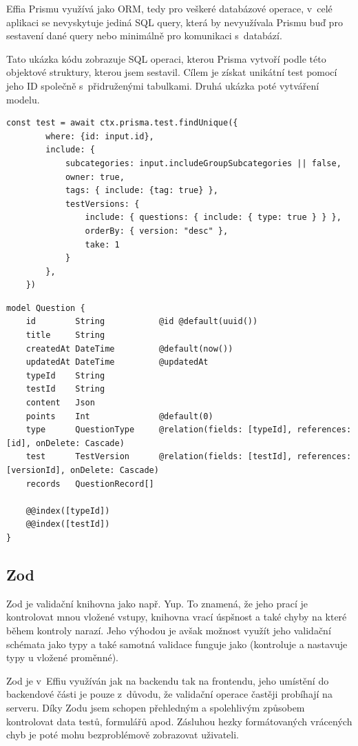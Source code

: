 \documentclass[12pt, a4paper,
openright
]{report}
\begin{document}
Effia Prismu využívá jako ORM, tedy pro veškeré databázové operace, v~celé aplikaci se nevyskytuje jediná SQL query, která by nevyužívala Prismu buď pro sestavení dané query nebo minimálně pro komunikaci s~databází.

Tato ukázka kódu zobrazuje SQL operaci, kterou Prisma vytvoří podle této objektové struktury, kterou jsem sestavil. Cílem je získat unikátní test pomocí jeho ID společně s~přidruženými tabulkami. Druhá ukázka poté vytváření modelu.

\begin{lstlisting}[style=ES6, caption=Získání testu podle id a přidání dat ze spojených tabulek, label=prisma_code_use]
	const test = await ctx.prisma.test.findUnique({
		where: {id: input.id},
		include: {
			subcategories: input.includeGroupSubcategories || false,
			owner: true,
			tags: {	include: {tag: true} },
			testVersions: {
				include: { questions: { include: { type: true } } },
				orderBy: { version: "desc" },
				take: 1
			}
		},
	})
\end{lstlisting}

\begin{lstlisting}[style=ES6, caption=Schéma modelu verze testu, label=prisma_code_schema]
model Question {
	id        String           @id @default(uuid())
	title     String
	createdAt DateTime         @default(now())
	updatedAt DateTime         @updatedAt
	typeId    String
	testId    String
	content   Json
	points    Int              @default(0)
	type      QuestionType     @relation(fields: [typeId], references: [id], onDelete: Cascade)
	test      TestVersion      @relation(fields: [testId], references: [versionId], onDelete: Cascade)
	records   QuestionRecord[]
	
	@@index([typeId])
	@@index([testId])
}
\end{lstlisting}

\subsection{Zod}
Zod je validační knihovna jako např. Yup. To znamená, že jeho prací je kontrolovat mnou vložené vstupy, knihovna vrací úspšnost a také chyby na které během kontroly narazí. Jeho výhodou je avšak možnost využít jeho validační schémata jako typy a také samotná validace funguje jako  (kontroluje a nastavuje typy u vložené proměnné).

Zod je v~Effiu využíván jak na backendu tak na frontendu, jeho umístění do backendové části je pouze z~důvodu, že validační operace častěji probíhají na serveru. Díky Zodu jsem schopen přehledným a spolehlivým způsobem kontrolovat data testů, formulářů apod. Zásluhou hezky formátovaných vrácených chyb je poté mohu bezproblémově zobrazovat uživateli.
\end{document}
